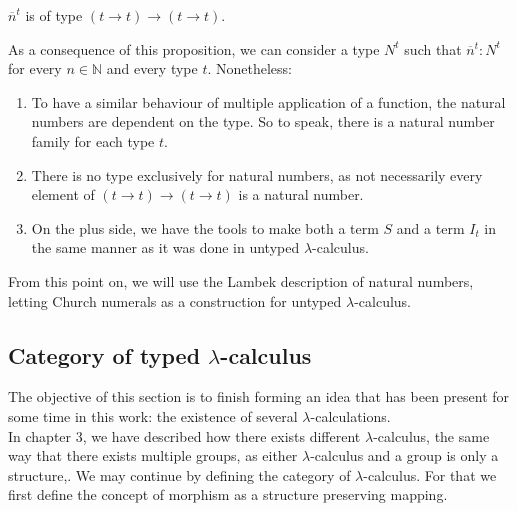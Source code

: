 \begin{remark}
  $\overline n^t$ is of type $(t\to t)\to(t\to t)$.
\end{remark}

As a consequence of this proposition, we can consider a type $N^t$ such that $\overline n^t:N^t$ for every $n\in\mathbb{N}$ and every type $t$. Nonetheless:
\begin{enumerate}

\item To have a similar behaviour of multiple application of a function, the natural numbers are dependent on the type. So to speak, there is a natural number family for each type $t$.
\item There is no type exclusively for natural numbers, as not necessarily every element of $(t\to t)\to(t\to t)$ is a natural number.
\item On the plus side, we have the tools to make both a term $S$ and a term $I_t$ in the same manner as it was done in untyped $\lambda$-calculus. \\
\end{enumerate}
From this point on, we will use the Lambek description of natural numbers, letting Church numerals as a construction for untyped $\lambda$-calculus.\\


\subsection{Category of typed $\lambda$-calculus}

The objective of this section is to finish forming an idea that has been present for some time in this work: the existence of several $\lambda$-calculations. \\

In chapter 3, we have described how there exists different $\lambda$-calculus, the same way that there exists multiple groups, as either $\lambda$-calculus and a group is only a structure,. We may continue by defining the category of $\lambda$-calculus. For that we first define the concept of morphism as a structure preserving mapping.



